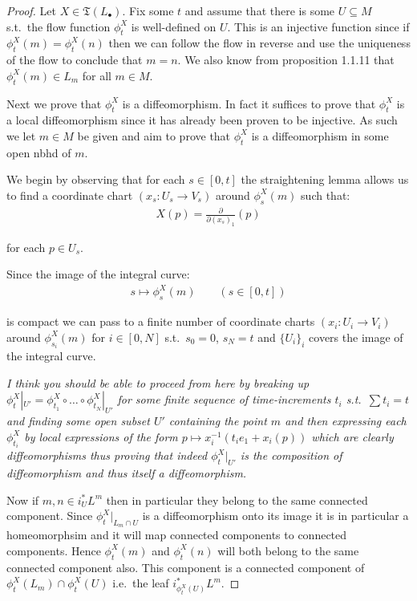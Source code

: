     \begin{proof}
        Let $X \in \mathfrak{T}(L_\bullet)$. Fix some $t$ and assume that there is some $U \subseteq M$ s.t.\ the flow function $\phi_t^X$ is well-defined on $U$. This is an injective function since if $\phi_t^X(m) = \phi_t^X(n)$ then we can follow the flow in reverse and use the uniqueness of the flow to conclude that $m = n$. We also know from proposition 1.1.11 that $\phi_t^X(m) \in L_m$ for all $m \in M$.

        Next we prove that $\phi_t^X$ is a diffeomorphism. In fact it suffices to prove that $\phi_t^X$ is a local diffeomorphism since it has already been proven to be injective. As such we let $m \in M$ be given and aim to prove that $\phi_t^X$ is a diffeomorphism in some open nbhd of $m$.

        We begin by observing that for each $s \in [0, t]$ the straightening lemma allows us to find a coordinate chart $(x_s : U_s \to V_s)$ around $\phi_s^X(m)$ such that:
%
        \begin{align*}
            X(p) = \frac{\partial}{\partial (x_s)_1}(p)
        \end{align*}

        for each $p \in U_s$.
        
        Since the image of the integral curve:
        \begin{align*}
            s \mapsto \phi_s^X(m) \qquad (s \in [0, t])
        \end{align*}

        is compact we can pass to a finite number of coordinate charts $(x_i : U_i \to V_i)$ around $\phi_{s_i}^X(m)$ for $i \in [0, N]$ s.t.\ $s_0 = 0$, $s_N = t$ and $\{U_i\}_i$ covers the image of the integral curve.

        \textit{I think you should be able to proceed from here by breaking up $\phi_t^X|_{U'} = \phi_{t_1}^X \circ \ldots \circ \phi_{t_N}^X|_{U'}$ for some finite sequence of time-increments $t_i$ s.t.\ $\sum t_i = t$ and finding some open subset $U'$ containing the point $m$ and then expressing each $\phi_{t_i}^X$ by local expressions of the form $p \mapsto x_i^{-1}(t_i e_1 + x_i(p))$ which are clearly diffeomorphisms thus proving that indeed $\phi_t^X|_{U'}$ is the composition of diffeomorphism and thus itself a diffeomorphism.}

        Now if $m, n \in i_U^* L^m$ then in particular they belong to the same connected component. Since $\phi_t^X|_{L_m \cap U}$ is a diffeomorphism onto its image it is in particular a homeomorphsim and it will map connected components to connected components. Hence $\phi_t^X(m)$ and $\phi_t^X(n)$ will both belong to the same connected component also. This component is a connected component of $\phi^X_t(L_m) \cap \phi^X_t(U)$ i.e.\ the leaf $i_{\phi_t^X(U)}^*L^m$.
    \end{proof}

